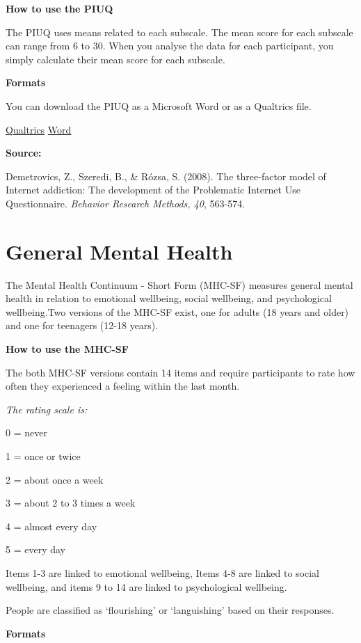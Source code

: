 \documentclass[
]{book}
\begin{document}
\textbf{How to use the PIUQ}

The PIUQ uses means related to each subscale. The mean score for each subscale can range from 6 to 30. When you analyse the data for each participant, you simply calculate their mean score for each subscale.

\textbf{Formats}

You can download the PIUQ as a Microsoft Word or as a Qualtrics file.

\href{./questionnaires/Problematic_Internet_Use_Questionnaire_PIUQ.qsf}{Qualtrics} \textbar{}
\href{./questionnaires/ProblematicInternetUseQuestionnaire.docx}{Word}

\textbf{Source:}

Demetrovics, Z., Szeredi, B., \& Rózsa, S. (2008). The three-factor model of Internet addiction: The development of the Problematic Internet Use Questionnaire. \emph{Behavior Research Methods, 40}, 563-574.

\hypertarget{general-mental-health}{%
\section{General Mental Health}\label{general-mental-health}}

The Mental Health Continuum - Short Form (MHC-SF) measures general mental health in relation to emotional wellbeing, social wellbeing, and psychological wellbeing.Two versions of the MHC-SF exist, one for adults (18 years and older) and one for teenagers (12-18 years).

\textbf{How to use the MHC-SF}

The both MHC-SF versions contain 14 items and require participants to rate how often they experienced a feeling within the last month.

\emph{The rating scale is:}

0 = never

1 = once or twice

2 = about once a week

3 = about 2 to 3 times a week

4 = almost every day

5 = every day

Items 1-3 are linked to emotional wellbeing, Items 4-8 are linked to social wellbeing, and items 9 to 14 are linked to psychological wellbeing.

People are classified as `flourishing' or `languishing' based on their responses.

\textbf{Formats}
\end{document}
